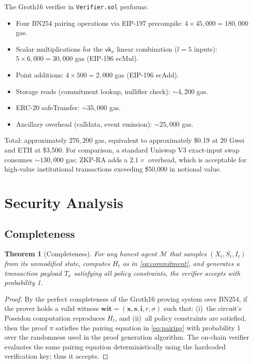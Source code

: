 \documentclass[final,5p,times,twocolumn]{elsarticle}
\theoremstyle{plain}
\newtheorem{theorem}{Theorem}[section]
\theoremstyle{definition}
\theoremstyle{remark}
\begin{document}
The Groth16 verifier in \texttt{Verifier.sol} performs:
\begin{itemize}
  \item Four BN254 pairing operations via EIP-197 precompile:
        $4 \times 45{,}000 = 180{,}000$ gas.
  \item Scalar multiplications for the $\mathsf{vk}_x$ linear combination
        ($l = 5$ inputs): $5 \times 6{,}000 = 30{,}000$ gas (EIP-196 ecMul).
  \item Point additions: $4 \times 500 = 2{,}000$ gas (EIP-196 ecAdd).
  \item Storage reads (commitment lookup, nullifier check): $\sim 4{,}200$ gas.
  \item ERC-20 safeTransfer: $\sim 35{,}000$ gas.
  \item Ancillary overhead (calldata, event emission): $\sim 25{,}000$ gas.
\end{itemize}
Total: approximately $276{,}200$ gas, equivalent to approximately \$0.19 at
20 Gwei and ETH at \$3{,}500. For comparison, a standard Uniswap V3 exact-input
swap consumes $\sim 130{,}000$ gas; ZKP-RA adds a $2.1\times$ overhead, which
is acceptable for high-value institutional transactions exceeding \$50{,}000 in
notional value.

\section{Security Analysis}
\label{sec:security}

\subsection{Completeness}
\label{sec:completeness}

\begin{theorem}[Completeness]
\label{thm:completeness}
For any honest agent $\mathcal{M}$ that samples $(X_t, S_t, I_t)$ from its
unmodified state, computes $H_t$ as in \cref{eq:commitment}, and generates a
transaction payload $T_x$ satisfying all policy constraints, the verifier
accepts with probability 1.
\end{theorem}

\begin{proof}
By the perfect completeness of the Groth16 proving system over BN254, if the
prover holds a valid witness $\mathbf{wit} = (\mathbf{x}, \mathbf{s},
\mathbf{i}, r, \sigma)$ such that:
(i)~the circuit's Poseidon computation reproduces $H_t$, and
(ii)~all policy constraints are satisfied,
then the proof $\pi$ satisfies the pairing equation in \cref{eq:pairing}
with probability 1 over the randomness used in the proof generation
algorithm. The on-chain verifier evaluates the same pairing equation
deterministically using the hardcoded verification key; thus it accepts.
\end{proof}
\end{document}
